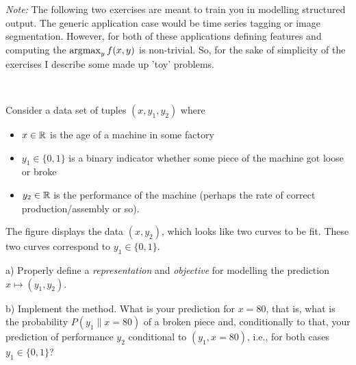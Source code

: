 

\renewcommand{\course}{Machine Learning}
\renewcommand{\exnum}{5}

\exercises
{}
\exercisestitle



\emph{Note:} The following two exercises are meant to train you in
modelling structured output. The generic application case would be
time series tagging or image segmentation. However, for both of these
applications defining features and computing the $\operatorname*{argmax}_y f(x,y)$ is
non-trivial. So, for the sake of simplicity of the exercises I
describe some made up 'toy' problems.

~

\begin{figure}
\end{figure}

Consider a data set of tuples $(x,y_1,y_2)$ where
\begin{itemize}
\item $x\in{\mathbb{R}}$ is the age of a machine in some factory
\item $y_1\in\{0,1\}$ is a binary indicator whether some piece of the
  machine got loose or broke
\item $y_2\in{\mathbb{R}}$ is the performance of the machine (perhaps the
  rate of correct production/assembly or so).
\end{itemize}
The figure displays the data $(x,y_2)$, which looks like two curves to
be fit. These two curves correspond to $y_1\in\{0,1\}$.

a) Properly define a \emph{representation} and \emph{objective} for
modelling the prediction $x \mapsto (y_1, y_2)$.

b) Implement the method. What is your prediction for $x=80$, that is,
what is the probability $P(y_1 \| x=80)$ of a broken piece and,
conditionally to that, your prediction of performance $y_2$
conditional to $(y_1, x=80)$, i.e., for both cases $y_1\in\{0,1\}$?

\exerfoot



